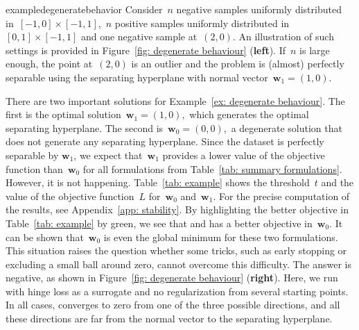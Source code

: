 \begin{restatable}{example}{degeneratebehavior}\label{ex: degenerate behaviour}
  Consider~$n$ negative samples uniformly distributed in~$[-1,0]\times[-1,1]$,~$n$ positive samples uniformly distributed in~$[0,1]\times[-1,1]$ and one negative sample at~$(2,0).$ An illustration of such settings is provided in Figure~\ref{fig: degenerate behaviour} (\textbf{left}). If~$n$ is large enough, the point at~$(2,0)$ is an outlier and the problem is (almost) perfectly separable using the separating hyperplane with normal vector~$\bm{w}_1 = (1, 0)$. 
\end{restatable}

There are two important solutions for Example~\ref{ex: degenerate behaviour}. The first is the optimal solution~$\bm{w}_1=(1,0),$ which generates the optimal separating hyperplane. The second is~$\bm{w}_0=(0,0),$ a degenerate solution that does not generate any separating hyperplane. Since the dataset is perfectly separable by $\bm{w}_1$, we expect that~$\bm{w}_1$ provides a lower value of the objective function than~$\bm{w}_0$ for all formulations from Table~\ref{tab: summary formulations}. However, it is not happening. Table~\ref{tab: example} shows the threshold~$t$ and the value of the objective function~$L$ for~$\bm{w}_0$ and~$\bm{w}_1.$ For the precise computation of the results, see Appendix~\ref{app: stability}. By highlighting the better objective in Table~\ref{tab: example} by green, we see that \TopPush and \TopMeanK has a better objective in~$\bm{w}_0.$ It can be shown that~$\bm{w}_0$ is even the global minimum for these two formulations. This situation raises the question whether some tricks, such as early stopping or excluding a small ball around zero, cannot overcome this difficulty. The answer is negative, as shown in Figure~\ref{fig: degenerate behaviour} (\textbf{right}). Here, we run \TopPush with hinge loss as a surrogate and no regularization from several starting points. In all cases, \TopPush converges to zero from one of the three possible directions, and all these directions are far from the normal vector to the separating hyperplane.


